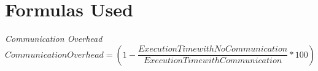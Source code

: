\documentclass{article}
\begin{document}

\section{Formulas Used}

\begin{enumerate}
\begin{item}
    \emph{Communication Overhead} 
    \begin{equation*}
    Communication Overhead  = (1 - \frac{Execution Time with No Communication}{Execution Time with Communication} * 100)
    \end{equation*}
\end{item}

\end{enumerate}
\end{document}
